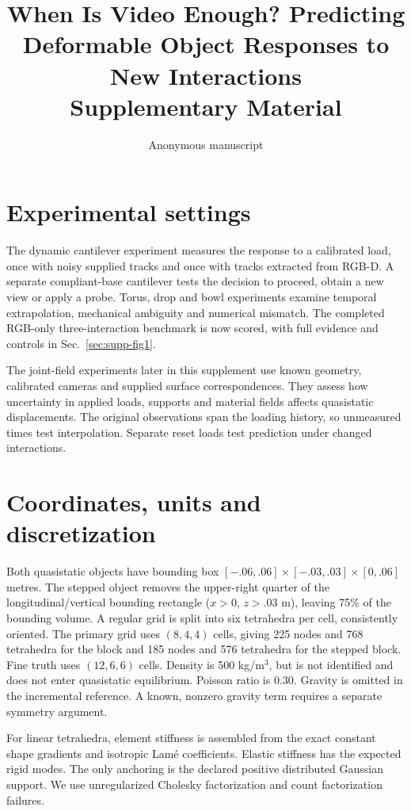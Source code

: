 \documentclass[10pt,twocolumn,letterpaper]{article}
\title{When Is Video Enough? Predicting Deformable Object Responses to New Interactions\\[2pt]\large Supplementary Material}
\author{Anonymous manuscript}
\begin{document}
\maketitle
\section{Experimental settings}
The dynamic cantilever experiment measures the response to a calibrated load, once with noisy supplied tracks and once with tracks extracted from RGB-D. A separate compliant-base cantilever tests the decision to proceed, obtain a new view or apply a probe. Torus, drop and bowl experiments examine temporal extrapolation, mechanical ambiguity and numerical mismatch. The completed RGB-only three-interaction benchmark is now scored, with full evidence and controls in Sec.~\ref{sec:supp-fig1}.

The joint-field experiments later in this supplement use known geometry, calibrated cameras and supplied surface correspondences. They assess how uncertainty in applied loads, supports and material fields affects quasistatic displacements. The original observations span the loading history, so unmeasured times test interpolation. Separate reset loads test prediction under changed interactions.




\section{Coordinates, units and discretization}
Both quasistatic objects have bounding box $[-.06,.06]\times[-.03,.03]\times[0,.06]$ metres. The stepped object removes the upper-right quarter of the longitudinal/vertical bounding rectangle ($x>0$, $z>.03$ m), leaving 75\% of the bounding volume. A regular grid is split into six tetrahedra per cell, consistently oriented. The primary grid uses $(8,4,4)$ cells, giving 225 nodes and 768 tetrahedra for the block and 185 nodes and 576 tetrahedra for the stepped block. Fine truth uses $(12,6,6)$ cells. Density is 500 kg/m$^3$, but is not identified and does not enter quasistatic equilibrium. Poisson ratio is 0.30. Gravity is omitted in the incremental reference. A known, nonzero gravity term requires a separate symmetry argument.

For linear tetrahedra, element stiffness is assembled from the exact constant shape gradients and isotropic Lam\'e coefficients. Elastic stiffness has the expected rigid modes. The only anchoring is the declared positive distributed Gaussian support. We use unregularized Cholesky factorization and count factorization failures.
\end{document}
